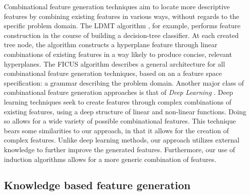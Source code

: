 \documentclass[twoside,11pt]{article}
\theoremstyle{definition}
\begin{document}
Combinational feature generation techniques aim to locate more descriptive features by combining existing features in various ways, without regards to the specific problem domain. The LDMT algorithm \cite{utgo1991linear}, for example, performs feature construction in the course of building a decision-tree classifier. At each created tree node, the algorithm constructs a hyperplane feature through linear combinations of existing features in a way likely to produce concise, relevant hyperplanes. The FICUS algorithm \cite{markovitch2002feature} describes a general architecture for all combinational feature generation techniques, based on an a feature space specification: a grammar describing the problem domain.
Another major class of combinational feature generation approaches is that of \emph{Deep Learning} . Deep learning techniques seek to create features through complex combinations of existing features, using a deep structure of linear and non-linear functions.
Doing so allows for a wide variety of possible combinational features.
This technique bears some similarities to our approach, in that it allows for the creation of complex features. Unlike deep learning methods, our approach utilizes external knowledge to further improve the generated features. Furthermore, our use of induction algorithms allows for a more generic combination of features.

\subsection{Knowledge based feature generation}
\end{document}
